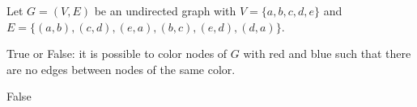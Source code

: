 \begin{prob}
    Let $G=(V,E)$ be an undirected graph with $V=\{a,b,c,d,e\}$ and $E=\{(a,b),(c,d),(e,a),(b,c),(e,d),(d,a)\}$. 

    True or False: it
    is possible to color nodes of $G$ with red and blue such that there are no edges between nodes of the same color.

    \tF{}

    \begin{soln}
        False
    \end{soln}
\end{prob}